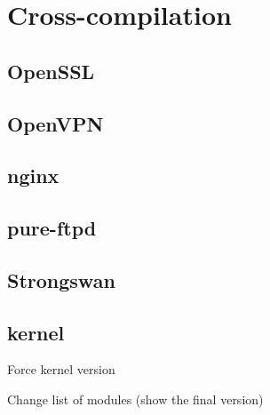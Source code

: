 \chapter{Cross-compilation}

\section{OpenSSL}

\section{OpenVPN}

\section{nginx}

\section{pure-ftpd}

\section{Strongswan}

\section{kernel}
Force kernel version

Change list of modules (show the final version)